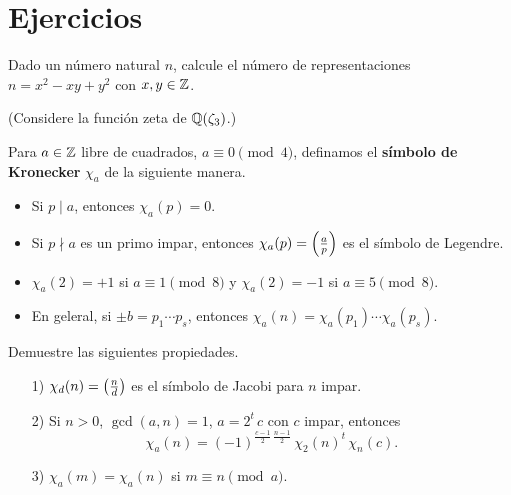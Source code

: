 
\iffalse
\section{Equivalencia aritmética}

Hemos visto hasta el momento que la función zeta $\zeta_K (s)$ trae mucha
información aritmética sobre el campo de números $K$. Sin embargo, $\zeta_K (s)$
no sabe \emph{todo} de $K$: podemos tener $\zeta_K (s) = \zeta_{K'} (s)$ para
dos campos no isomorfos $K \not\cong K'$.

**TODO** \cite{Perlis-1977}.
\fi


\pagebreak


\section*{Ejercicios}

\begin{ejercicio}
  Dado un número natural $n$, calcule el número de representaciones
  $n = x^2 - xy + y^2$ con $x,y \in \mathbb{Z}$.

  \noindent (Considere la función zeta de $\mathbb{Q} (\zeta_3)$.)
\end{ejercicio}

\begin{ejercicio}
  Para $a \in \mathbb{Z}$ libre de cuadrados, $a \equiv 0 \pmod{4}$, definamos el
  \textbf{símbolo de Kronecker} $\chi_a$ de la siguiente manera.
  \begin{itemize}
  \item Si $p \mid a$, entonces $\chi_a (p) = 0$.
  \item Si $p \nmid a$ es un primo impar, entonces $\chi_a (p) = \left(\frac{a}{p}\right)$
    es el símbolo de Legendre.
  \item $\chi_a (2) = +1$ si $a \equiv 1 \pmod{8}$ y $\chi_a (2) = -1$ si
    $a \equiv 5 \pmod{8}$.
  \item En geleral, si $\pm b = p_1 \cdots p_s$, entonces
    $\chi_a (n) = \chi_a (p_1) \cdots \chi_a (p_s)$.
  \end{itemize}

  Demuestre las siguientes propiedades.
  \begin{enumerate}
  \item[1)] $\chi_d (n) = \left(\frac{n}{d}\right)$ es el símbolo de Jacobi para $n$
    impar.
  \item[2)] Si $n > 0$, $\gcd (a,n) = 1$, $a = 2^t\,c$ con $c$ impar, entonces
    $$\chi_a (n) = (-1)^{\frac{c-1}{2}\,\frac{n-1}{2}}\,\chi_2 (n)^t \, \chi_n (c).$$
  \item[3)] $\chi_a (m) = \chi_a (n)$ si $m \equiv n \pmod{a}$.
  \end{enumerate}
\end{ejercicio}

